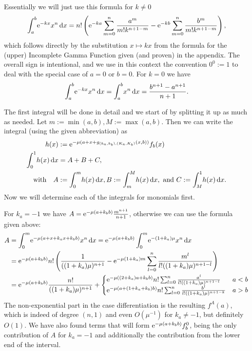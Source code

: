 \begin{Lemma}
  \begin{Proof}
    Essentially we will just use this formula for $k \neq 0$
    \begin{align}
      \Integ[b]{a}{x}{\Eto{-kx}x^n}
        = n!\left(\Eto{-ka}\sum_{m=0}^n \frac{a^m}{m!k^{n+1-m}} -
                  \Eto{-kb}\sum_{m=0}^n \frac{b^m}{m!k^{n+1-m}}\right),
    \end{align}
    which follows directly by the substitution $x \mapsto kx$ from the formula
    for the (upper) Incomplete Gamma Function given (and proven) in the
    appendix.
    The overall sign is intentional, and we use in this context the convention
    $0^0 := 1$ to deal with the special case of $a = 0$ or $b = 0$. For $k = 0$
    we have
    \begin{align}
      \Integ[b]{a}{x}{\Eto{-kx}x^n} = \Integ[b]{a}{x}{x^n} = \frac{b^{n+1} -
      a^{n+1}}{n+1}.
    \end{align}

    The first integral will be done in detail and we start of by splitting it up
    as much as needed. Let $m := \min(a,b), M := \max(a,b)$. Then we can write
    the integral (using the given abbreviation) as
    \begin{align*}
      h(x) &:= \Eto{-\mu(a+x+g_{(k_a,k_b),(K_a,K_b)}(x, b))}f_b(x) \\
      \Int{x}{h(x)} &= A + B + C, \\ \text{with} \quad
      A &:= \Integ[m]{0}{x}{h(x)},
      B := \Integ[M]{m}{x}{h(x)},\text{ and }
      C := \Integ[1]{M}{x}{h(x)}.
    \end{align*}
    Now we will determine each of the integrals for monomials first.
    
    For $k_a = -1$ we have $A = \Eto{-\mu (a+k_b b)} \frac{m^{n+1}}{n+1}$,
    otherwise we can use the formula given above:
    \begin{align*}
      A &= \Integ[m]{0}{x}{\Eto{-\mu(a+x+k_a x+k_b b)}x^n}
         = \Eto{-\mu(a+k_b b)} \Integ[m]{0}{x}{\Eto{-(1+k_a)\mu}x^n} \\
        &= \Eto{-\mu(a+k_b b)} n! \left(
         \frac{1}{((1+k_a)\mu)^{n+1}}
         - \Eto{-\mu(1+k_a)m}\sum_{l=0}^n \frac{m^l}{l! ((1+k_a)\mu)^{n+1-l}}
        \right) \\
      &= \Eto{-\mu(a+k_b b)} \frac{n!}{((1+k_a)\mu)^{n+1}} +
        \begin{cases}
        \Eto{-\mu((2+k_a) a+k_b b)} n! \sum_{l=0}^n
        \frac{a^l}{l!((1+k_a)\mu)^{n+1-l}}
          & a < b \\
          \Eto{-\mu(a + (1+k_a+k_b)b)} n! \sum_{l=0}^n
          \frac{b^l}{l!((1+k_a)\mu)^{n+1-k}}
          & a > b
      \end{cases}
    \end{align*}
    The non-exponential part in the case differentiation is the resulting
    $f^A(a)$, which is indeed of degree $(n,1)$ and even $O(\mu^{-1})$ for
    $k_a\neq -1$, but definitely $O(1)$. We have also found terms that will form
    $\Eto{-\mu(a+k_b b)} f^0_b$, being the only contribution of $A$ for $k_a
    = -1$ and additionally the contribution from the lower end of the interval.


\end{Proof}
\end{Lemma}
